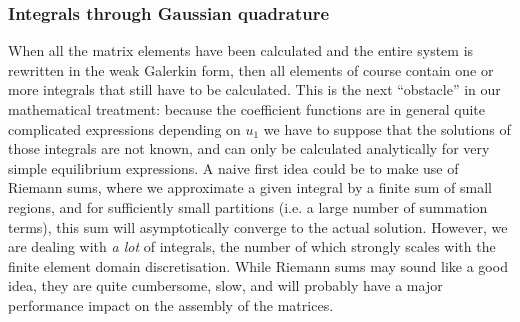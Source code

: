 \subsubsection{Integrals through Gaussian quadrature}
When all the matrix elements have been calculated and the entire system is rewritten in the weak Galerkin form, then all elements of course contain one or more integrals that still have to be calculated. This is the next ``obstacle'' in our mathematical treatment: because the coefficient functions are in general quite complicated expressions depending on $u_1$ we have to suppose that the solutions of those integrals are not known, and can only be calculated analytically for very simple equilibrium expressions. A naive first idea could be to make use of Riemann sums, where we approximate a given integral by a finite sum of small regions, and for sufficiently small partitions (i.e. a large number of summation terms), this sum will asymptotically converge to the actual solution. However, we are dealing with \emph{a lot} of integrals, the number of which strongly scales with the finite element domain discretisation. While Riemann sums may sound like a good idea, they are quite cumbersome, slow, and will probably have a major performance impact on the assembly of the matrices.

